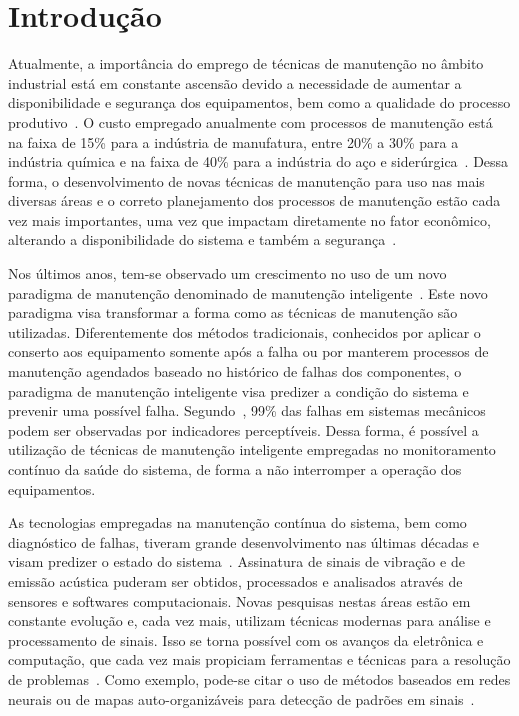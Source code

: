 \chapter{Introdução}

Atualmente, a importância do emprego de técnicas de manutenção no âmbito industrial está em
constante ascensão devido a necessidade de aumentar a disponibilidade e segurança dos equipamentos,
bem como a qualidade do processo produtivo~\cite{muller2008formalisation}. O custo empregado
anualmente com processos de manutenção está na faixa de 15\% para a indústria de manufatura, entre
20\% a 30\% para a indústria química e na faixa de 40\% para a indústria do aço e
siderúrgica~\cite{chu1998predictive, nguyen2008new}. Dessa forma, o desenvolvimento de novas
técnicas de manutenção para uso nas mais diversas áreas e o correto planejamento dos processos de
manutenção estão cada vez mais importantes, uma vez que impactam diretamente no fator econômico,
alterando a disponibilidade do sistema e também a segurança~\cite{zhao2010soabased}.

Nos últimos anos, tem-se observado um crescimento no uso de um novo paradigma de manutenção
denominado de manutenção inteligente~\cite{zhang2013performance}. Este novo paradigma visa
transformar a forma como as técnicas de manutenção são utilizadas. Diferentemente dos métodos
tradicionais, conhecidos por aplicar o conserto aos equipamento somente após a falha ou por manterem
processos de manutenção agendados baseado no histórico de falhas dos componentes, o paradigma de
manutenção inteligente visa predizer a condição do sistema e prevenir uma possível falha.
Segundo~\cite{bloch2012machinery}, 99\% das falhas em sistemas mecânicos podem ser observadas por
indicadores perceptíveis. Dessa forma, é possível a utilização de técnicas de manutenção inteligente
empregadas no monitoramento contínuo da saúde do sistema, de forma a não interromper a operação dos
equipamentos.

As tecnologias empregadas na manutenção contínua do sistema, bem como diagnóstico de falhas, tiveram
grande desenvolvimento nas últimas décadas e visam predizer o estado do
sistema~\cite{heng2009rotating}. Assinatura de sinais de vibração e de emissão acústica puderam ser
obtidos, processados e analisados através de sensores e softwares computacionais. Novas pesquisas
nestas áreas estão em constante evolução e, cada vez mais, utilizam técnicas modernas para análise e
processamento de sinais. Isso se torna possível com os avanços da eletrônica e computação, que cada
vez mais propiciam ferramentas e técnicas para a resolução de problemas~\cite{zhao2010predictive}.
Como exemplo, pode-se citar o uso de métodos baseados em redes neurais ou de mapas auto-organizáveis
para detecção de padrões em sinais~\cite{goncalves2011fault}.

